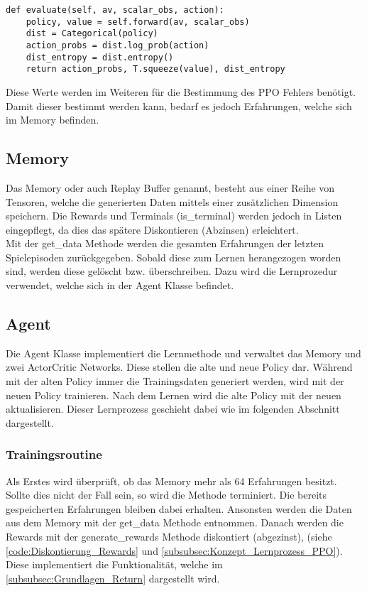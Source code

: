 \begin{lstlisting}[caption=Darstellung der evaluate Methode, label=code:evaluate_Methode, style=Python]
def evaluate(self, av, scalar_obs, action):
	policy, value = self.forward(av, scalar_obs)
	dist = Categorical(policy)
	action_probs = dist.log_prob(action)
	dist_entropy = dist.entropy()
	return action_probs, T.squeeze(value), dist_entropy
\end{lstlisting}
Diese Werte werden im Weiteren für die Bestimmung des PPO Fehlers benötigt. Damit dieser bestimmt werden kann, bedarf es jedoch Erfahrungen, welche sich im Memory befinden.

\subsection{Memory} \label{subsec:Implementierung_Memory_PPO}
Das Memory oder auch Replay Buffer genannt, besteht aus einer Reihe von Tensoren, welche die generierten Daten mittels einer zusätzlichen Dimension speichern. Die Rewards und Terminals (is\_terminal) werden jedoch in Listen eingepflegt, da dies das spätere Diskontieren (Abzinsen) erleichtert.\\
Mit der get\_data Methode werden die gesamten Erfahrungen der letzten Spielepisoden zurückgegeben. 
Sobald diese zum Lernen herangezogen worden sind, werden diese gelöscht bzw. überschreiben. Dazu wird die Lernprozedur verwendet, welche sich in der Agent Klasse befindet. 

\subsection{Agent} \label{sec:Implementierung_PPO_Agent}
Die Agent Klasse implementiert die Lernmethode und verwaltet das Memory und zwei ActorCritic Networks. Diese stellen die alte und neue Policy dar. Während mit der alten Policy immer die Trainingsdaten generiert werden, wird mit der neuen Policy trainieren. Nach dem Lernen wird die alte Policy mit der neuen aktualisieren. Dieser Lernprozess geschieht dabei wie im folgenden Abschnitt dargestellt.

\subsubsection{Trainingsroutine} \label{subsubsec:Implementierung_Trainingsroutine_PPO}
Als Erstes wird überprüft, ob das Memory mehr als 64 Erfahrungen besitzt. Sollte dies nicht der Fall sein, so wird die Methode terminiert. 
Die bereits gespeicherten Erfahrungen bleiben dabei erhalten.
Ansonsten werden die Daten aus dem Memory mit der get\_data Methode entnommen.
Danach werden die Rewards mit der generate\_rewards Methode diskontiert (abgezinst), (siehe \autoref{code:Diskontierung_Rewards} und \autoref{subsubsec:Konzept_Lernprozess_PPO}). Diese implementiert die Funktionalität, welche im \autoref{subsubsec:Grundlagen_Return} dargestellt wird.

